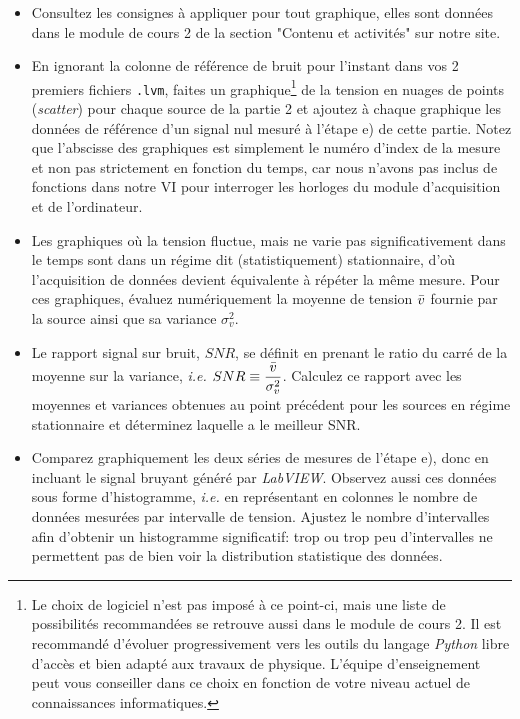\documentclass[canadien,12pt,oneside,letterpaper]{article}
\begin{document}
\begin{itemize}
    \item Consultez les consignes à appliquer pour tout graphique, elles sont données dans le module de cours 2 de la section "Contenu et activités" sur notre site.
    \item En ignorant la colonne de référence de bruit pour l'instant dans vos 2 premiers fichiers \texttt{.lvm}, faites un graphique\footnote{Le choix de logiciel n'est pas imposé à ce point-ci, mais une liste de possibilités recommandées se retrouve aussi dans le module de cours 2. Il est recommandé d'évoluer progressivement vers les outils du langage \textit{Python} libre d'accès et bien adapté aux travaux de physique. L'équipe d'enseignement peut vous conseiller dans ce choix en fonction de votre niveau actuel de connaissances informatiques.} de la tension en nuages de points (\textit{scatter}) pour chaque source de la partie 2 et ajoutez à chaque graphique les données de référence d'un signal nul mesuré à l'étape e) de cette partie. Notez que l'abscisse des graphiques est simplement le numéro d'index de la mesure et non pas strictement en fonction du temps, car nous n'avons pas inclus de fonctions dans notre VI pour interroger les horloges du module d'acquisition et de l'ordinateur.
    \item Les graphiques où la tension fluctue, mais ne varie pas significativement dans le temps sont dans un régime dit (statistiquement) stationnaire, d'où l'acquisition de données devient équivalente à répéter la même mesure. Pour ces graphiques, évaluez numériquement la moyenne de tension $\Bar{v}$ fournie par la source ainsi que sa variance $\sigma_v^2$.
    \item Le rapport signal sur bruit, $SNR$, se définit en prenant le ratio du carré de la moyenne sur la variance, \textit{i.e.} \(\displaystyle SNR\equiv \frac{\Bar{v}}{\sigma_v^2}\). Calculez ce rapport avec les moyennes et variances obtenues au point précédent pour les sources en régime stationnaire et déterminez laquelle a le meilleur SNR.
    \item Comparez graphiquement les deux séries de mesures de l'étape e), donc en incluant le signal bruyant généré par \textit{LabVIEW}. Observez aussi ces données sous forme d'histogramme, \textit{i.e.} en représentant en colonnes le nombre de données mesurées par intervalle de tension. Ajustez le nombre d'intervalles afin d'obtenir un histogramme significatif: trop ou trop peu d'intervalles ne permettent pas de bien voir la distribution statistique des données.
\end{itemize}
\end{document}
